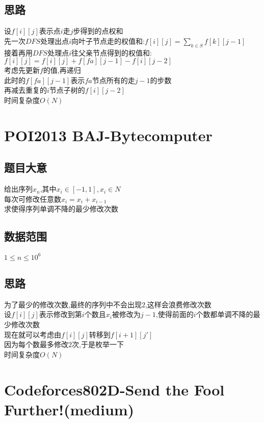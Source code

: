 \documentclass{ctexart}
\numberwithin{equation}{section}
\begin{document}
\begin{flushleft}
  \subsection{思路}
  设$f[i][j]$表示点$i$走$j$步得到的点权和 \\
  先一次$DFS$处理出点$i$向叶子节点走的权值和:$f[i][j]=\sum_{k\in S}f[k][j-1]$ \\
  接着再用$DFS$处理点$i$往父亲节点得到的权值和:$f[i][j] =f[i][j] + f[fa][j-1]-f[i][j-2]$ \\
  考虑先更新$f$的值,再递归 \\
  此时的$f[fa][j-1]$表示$fa$节点所有的走$j-1$的步数\\
  再减去重复的$i$节点子树的$f[i][j-2]$ \\ 
  时间复杂度$O(N)$ \\
  \newpage

  \section{POI2013 BAJ-Bytecomputer}
  \subsection{题目大意}
  给出序列${x_n}$,其中$x_i \in [-1,1],x_i \in N$ \\
  每次可修改任意数$x_i = x_i+x_{i-1}$ \\
  求使得序列单调不降的最少修改次数 \\
  \subsection{数据范围}
  $1\leq n \leq 10^6$ \\
  \subsection{思路}
  为了最少的修改次数,最终的序列中不会出现$2$,这样会浪费修改次数 \\
  设$f[i][j]$表示修改到第$i$个数且$x_i$被修改为$j-1$,使得前面的$i$个数都单调不降的最少修改次数 \\
  现在就可以考虑由$f[i][j]$转移到$f[i+1][j']$ \\
  因为每个数最多修改$2$次,于是枚举一下 \\
  时间复杂度$O(N)$ \\
  \newpage

  \section{Codeforces802D-Send the Fool Further!(medium)}

\end{flushleft}
\end{document}
